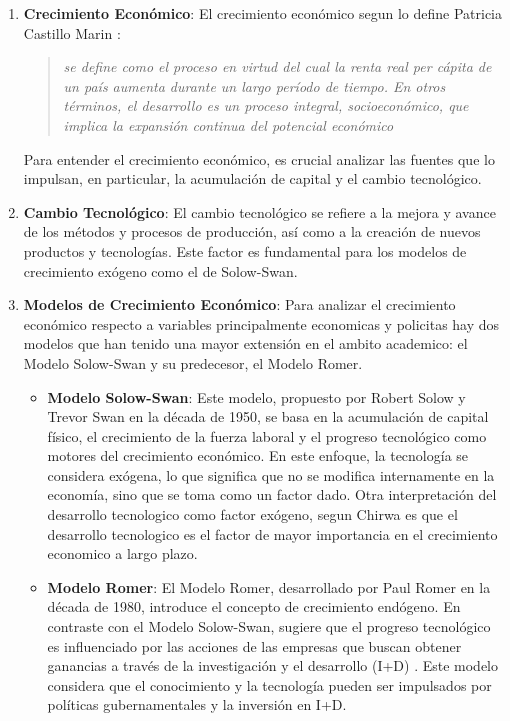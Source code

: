 \documentclass[letterpaper, 10pt]{article}
\begin{document}
  
\begin{enumerate}

  
  \item \textbf{Crecimiento Económico}: El crecimiento económico segun lo define Patricia Castillo Marin \cite{Eco11}:
  
    \begin{quote}
       \textit{ se define como el proceso en virtud del cual la renta real per cápita de un país aumenta durante un largo período de tiempo. En otros términos, el desarrollo es un proceso integral, socioeconómico, que implica la expansión continua del potencial económico}
    \end{quote}
    Para entender el crecimiento económico, es crucial analizar las fuentes que lo impulsan, en particular, la acumulación de capital y el cambio tecnológico.

  \item \textbf{Cambio Tecnológico}: El cambio tecnológico se refiere a la mejora y avance de los métodos y procesos de producción, así como a la creación de nuevos productos y tecnologías. Este factor es fundamental para los modelos de crecimiento exógeno como el de Solow-Swan\cite{Chirwa18}.
  
  \item \textbf{Modelos de Crecimiento Económico}: Para analizar el crecimiento económico respecto a variables principalmente economicas y policitas hay dos modelos que han tenido una mayor extensión en el ambito academico: el Modelo Solow-Swan y su predecesor, el Modelo Romer.
  
  \begin{itemize}
     
    \item \textbf{Modelo Solow-Swan}: Este modelo, propuesto por Robert Solow y Trevor Swan en la década de 1950, se basa en la acumulación de capital físico, el crecimiento de la fuerza laboral y el progreso tecnológico como motores del crecimiento económico.\cite{Martin11} 
    En este enfoque, la tecnología se considera exógena, lo que significa que no se modifica internamente en la economía, sino que se toma como un factor dado. Otra interpretación del desarrollo tecnologico como factor exógeno, segun Chirwa \cite{Chirwa18} es que el desarrollo tecnologico es el factor de mayor importancia en el crecimiento economico a largo plazo.
  
    \item \textbf{Modelo Romer}: El Modelo Romer, desarrollado por Paul Romer en la década de 1980, introduce el concepto de crecimiento endógeno. En contraste con el Modelo Solow-Swan, sugiere que el progreso tecnológico es influenciado por las acciones de las empresas que buscan obtener ganancias a través de la investigación y el desarrollo (I+D)\cite{Casparri13} . Este modelo considera que el conocimiento y la tecnología pueden ser impulsados por políticas gubernamentales y la inversión en I+D.
  

\end{itemize}
\end{enumerate}
\end{document}
